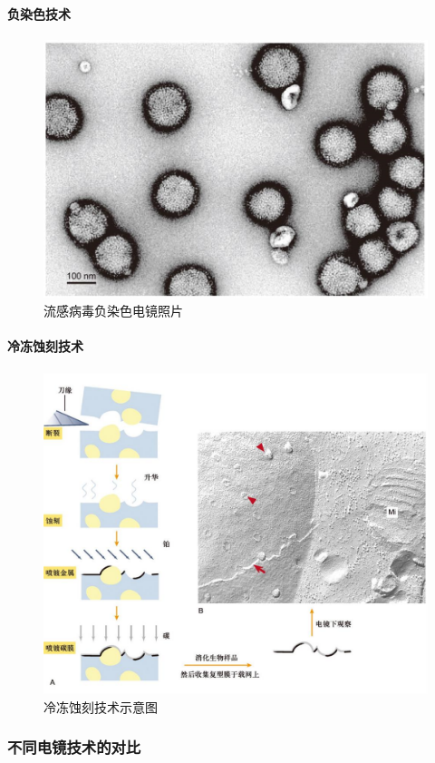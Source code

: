 \paragraph{负染色技术}

\begin{figure}[htbp]
	\centering
	\includegraphics[width=0.5\linewidth]{Pics/流感病毒负染色电镜照片}
	\caption{流感病毒负染色电镜照片}
	\label{fig:influenzaVirusNegativeStainingElectronMicrograph}
\end{figure}


\paragraph{冷冻蚀刻技术}

\begin{figure}[htbp]
	\centering
	\includegraphics[width=\linewidth]{Pics/冷冻蚀刻技术示意图}
	\caption{冷冻蚀刻技术示意图}
	\label{fig:cryoFractureTechniqueSchematicDiagram}
\end{figure}

\subsubsection{不同电镜技术的对比}

